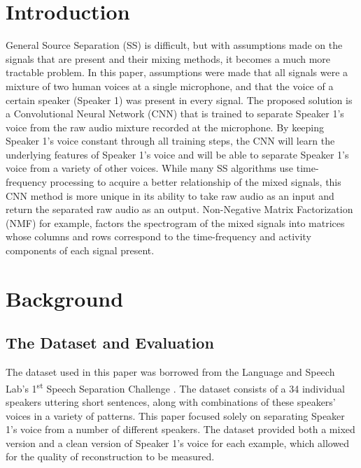 \documentclass[12pt,chapterheads]{ucsd}
\begin{document}
%







%   
%   
%


\section{Introduction}
\label{sec:intro}
General Source Separation (SS) is difficult, but with assumptions made on the signals that are present and their mixing methods, it becomes a much more tractable problem. In this paper, assumptions were made that all signals were a mixture of two human voices at a single microphone, and that the voice of  a certain speaker (Speaker 1) was present in every signal. The proposed solution is a Convolutional Neural Network (CNN) that is trained to separate Speaker 1's voice from the raw audio mixture recorded at the microphone. By keeping Speaker 1's voice constant through all training steps, the CNN will learn the underlying features of Speaker 1's voice and will be able to separate Speaker 1's voice from a variety of other voices. While many SS algorithms use time-frequency processing to acquire a better relationship of the mixed signals, this CNN method is more unique in its ability to take raw audio as an input and return the separated raw audio as an output. Non-Negative Matrix Factorization (NMF) for example, factors the spectrogram of the mixed signals into matrices whose columns and rows correspond to the time-frequency and activity components of each signal present.


\section{Background}
\subsection{The Dataset and Evaluation}
The dataset used in this paper was borrowed from the Language and Speech Lab's 1\textsuperscript{st} Speech Separation Challenge \cite{laslab}. The dataset consists of a 34 individual speakers uttering short sentences, along with combinations of these speakers' voices in a variety of patterns. This paper focused solely on separating Speaker 1's voice from a number of different  speakers. The dataset provided both a mixed version and a clean version of Speaker 1's voice for each example, which allowed for the quality of reconstruction to be measured. 
\end{document}
